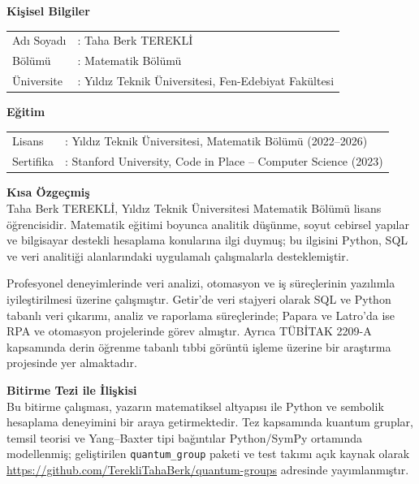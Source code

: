\documentclass[12pt,a4paper,fleqn]{report}
\newcommand{\normalsemi}{;}
\newcommand{\normalsemi}{\begingroup\semicolonfont;\endgroup}
\numberwithin{equation}{chapter}
\theoremstyle{plain}
\theoremstyle{definition}
\begin{document}
\noindent
\textbf{Kişisel Bilgiler}\\[4pt]
\begin{tabularx}{\textwidth}{@{}p{4cm}X@{}}
Adı Soyadı      & : Taha Berk TEREKLİ \\
Bölümü          & : Matematik Bölümü \\
Üniversite      & : Yıldız Teknik Üniversitesi, Fen-Edebiyat Fakültesi \\
\end{tabularx}

\vspace{0.6cm}
\noindent
\textbf{Eğitim}\\[4pt]
\begin{tabularx}{\textwidth}{@{}p{4cm}X@{}}
Lisans & : Yıldız Teknik Üniversitesi, Matematik Bölümü (2022--2026) \\
Sertifika & : Stanford University, Code in Place -- Computer Science (2023) \\
\end{tabularx}

\vspace{0.6cm}
\noindent
\textbf{Kısa Özgeçmiş}\\[4pt]
Taha Berk TEREKLİ, Yıldız Teknik Üniversitesi Matematik Bölümü lisans
öğrencisidir. Matematik eğitimi boyunca analitik düşünme, soyut cebirsel yapılar
ve bilgisayar destekli hesaplama konularına ilgi duymuş\normalsemi{} bu ilgisini Python,
SQL ve veri analitiği alanlarındaki uygulamalı çalışmalarla desteklemiştir.

Profesyonel deneyimlerinde veri analizi, otomasyon ve iş süreçlerinin yazılımla
iyileştirilmesi üzerine çalışmıştır. Getir'de veri stajyeri olarak SQL ve Python
tabanlı veri çıkarımı, analiz ve raporlama süreçlerinde\normalsemi{} Papara ve Latro'da ise
RPA ve otomasyon projelerinde görev almıştır. Ayrıca TÜBİTAK 2209-A kapsamında
derin öğrenme tabanlı tıbbi görüntü işleme üzerine bir araştırma projesinde yer
almaktadır.

\vspace{0.6cm}
\noindent
\textbf{Bitirme Tezi ile İlişkisi}\\[4pt]
Bu bitirme çalışması, yazarın matematiksel altyapısı ile Python ve sembolik
hesaplama deneyimini bir araya getirmektedir. Tez kapsamında kuantum gruplar,
temsil teorisi ve Yang--Baxter tipi bağıntılar Python/SymPy ortamında
modellenmiş\normalsemi{} geliştirilen \texttt{quantum\_group} paketi ve test takımı açık
kaynak olarak \url{https://github.com/TerekliTahaBerk/quantum-groups}
adresinde yayımlanmıştır.
\end{document}
